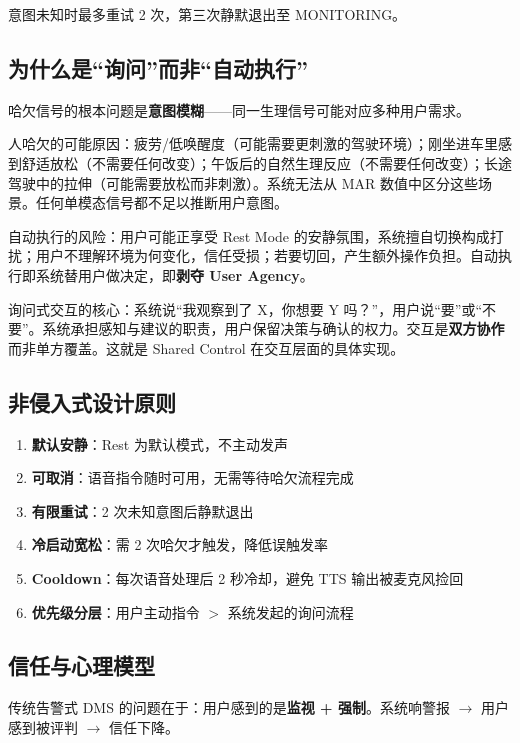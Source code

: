 \documentclass[12pt,a4paper]{ctexart}
\begin{document}
意图未知时最多重试 2 次，第三次静默退出至 MONITORING。

\subsection{为什么是“询问”而非“自动执行”}

哈欠信号的根本问题是\textbf{意图模糊}——同一生理信号可能对应多种用户需求。

人哈欠的可能原因：疲劳/低唤醒度（可能需要更刺激的驾驶环境）；刚坐进车里感到舒适放松（不需要任何改变）；午饭后的自然生理反应（不需要任何改变）；长途驾驶中的拉伸（可能需要放松而非刺激）。系统无法从 MAR 数值中区分这些场景。任何单模态信号都不足以推断用户意图。

自动执行的风险：用户可能正享受 Rest Mode 的安静氛围，系统擅自切换构成打扰；用户不理解环境为何变化，信任受损；若要切回，产生额外操作负担。自动执行即系统替用户做决定，即\textbf{剥夺 User Agency}。

询问式交互的核心：系统说“我观察到了 X，你想要 Y 吗？”，用户说“要”或“不要”。系统承担感知与建议的职责，用户保留决策与确认的权力。交互是\textbf{双方协作}而非单方覆盖。这就是 Shared Control 在交互层面的具体实现。

\subsection{非侵入式设计原则}

\begin{enumerate}[label=\arabic*.]
    \item \textbf{默认安静}：Rest 为默认模式，不主动发声
    \item \textbf{可取消}：语音指令随时可用，无需等待哈欠流程完成
    \item \textbf{有限重试}：2 次未知意图后静默退出
    \item \textbf{冷启动宽松}：需 2 次哈欠才触发，降低误触发率
    \item \textbf{Cooldown}：每次语音处理后 2 秒冷却，避免 TTS 输出被麦克风捡回
    \item \textbf{优先级分层}：用户主动指令 $>$ 系统发起的询问流程
\end{enumerate}

\subsection{信任与心理模型}

传统告警式 DMS 的问题在于：用户感到的是\textbf{监视 + 强制}。系统响警报 $\rightarrow$ 用户感到被评判 $\rightarrow$ 信任下降。
\end{document}
